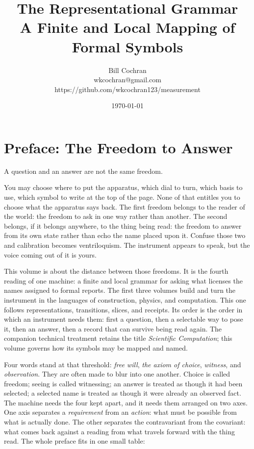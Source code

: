 \documentclass[12pt,oneside]{book}
\begin{document}
\title{The Representational Grammar\\[0.35em]\large A Finite and Local Mapping of Formal Symbols}
\author{Bill Cochran\\wkcochran@gmail.com\\https://github.com/wkcochran123/measurement}
\date{\today}
\maketitle

\frontmatter
\onehalfspacing

\chapter*{Preface: The Freedom to Answer}

A question and an answer are not the same freedom.

You may choose where to put the apparatus, which dial to turn, which basis to use, which symbol to write at the top of
the page. None of that entitles you to choose what the apparatus says back. The first freedom belongs to the reader of
the world: the freedom to ask in one way rather than another. The second belongs, if it belongs anywhere, to the thing
being read: the freedom to answer from its own state rather than echo the name placed upon it. Confuse those two and
calibration becomes ventriloquism. The instrument appears to speak, but the voice coming out of it is yours.

This volume is about the distance between those freedoms. It is the fourth reading of one machine: a finite and local
grammar for asking what licenses the names assigned to formal reports. The first three volumes build and turn the
instrument in the languages of construction, physics, and computation. This one follows representations, transitions,
slices, and receipts. Its order is the order in which an instrument needs them: first a question, then a selectable way
to pose it, then an answer, then a record that can survive being read again. The companion technical treatment retains
the title \emph{Scientific Computation}; this volume governs how its symbols may be mapped and named.

Four words stand at that threshold: \emph{free will}, \emph{the axiom of choice}, \emph{witness}, and
\emph{observation}. They are often made to blur into one another. Choice is called freedom; seeing is called witnessing;
an answer is treated as though it had been selected; a selected name is treated as though it were already an observed
fact. The machine needs the four kept apart, and it needs them arranged on two axes. One axis separates a
\emph{requirement} from an \emph{action}: what must be possible from what is actually done. The other separates the
contravariant from the covariant: what comes back against a reading from what travels forward with the thing read.
The whole preface fits in one small table:
\end{document}
